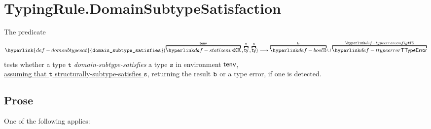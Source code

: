 \documentclass{book}
\newcommand\domsubtypesat[0]{\hyperlink{def-domsubtypesat}{\texttt{domain\_subtype\_satisfies}}}
\newcommand\vt[0]{\texttt{t}}
\newcommand\vs[0]{\texttt{s}}
\begin{document}
\section{TypingRule.DomainSubtypeSatisfaction\label{sec:TypingRule.DomainSubtypeSatisfaction}}
\hypertarget{def-domsubtypesat}{}
The predicate
\[
  \domsubtypesat(\overname{\staticenvs}{\tenv} \aslsep \overname{\ty}{\vt} \aslsep \overname{\ty}{\vs})
  \aslto \overname{\Bool}{\vb} \cup \overname{\TTypeError}{\TypeErrorConfig}
\]
tests whether a type $\vt$ \emph{domain-subtype-satisfies} a type $\vs$ in environment $\textsf{tenv}$,\\
\underline{assuming that $\vt$ structurally-subtype-satisfies $\vs$},
returning the result $\texttt{b}$ or a type error, if one is detected.

\subsection{Prose}
One of the following applies:
\end{document}
